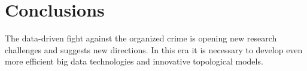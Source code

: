 \section{Conclusions}
\label{sec:conclusions}

The data-driven fight against the organized crime is opening new research challenges and suggests new directions. 
In this era it is necessary to develop even more efficient big data technologies and innovative topological models.

\lipsum[1]
